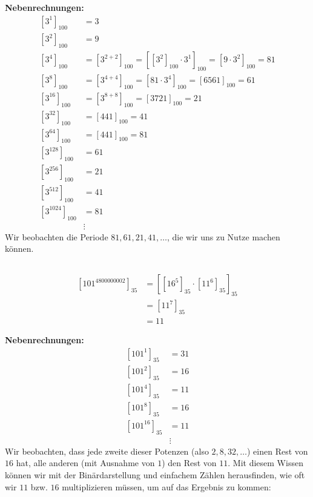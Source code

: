 \documentclass{../crypto}
\begin{document}
\textbf{Nebenrechnungen:}
\begin{align*}
  \left[3^{1}\right]_{100} &= 3 \\
  \left[3^{2}\right]_{100} &= 9 \\
  \left[3^{4}\right]_{100} &= \left[3^{2+2}\right]_{100} 
                            = \left[\left[3^{2}\right]_{100} \cdot 3^{1}\right]_{100} 
                            = \left[9 \cdot 3^{2}\right]_{100} = 81 \\
  \left[3^{8}\right]_{100} &= \left[3^{4+4}\right]_{100}
                            = \left[81 \cdot 3^{4}\right]_{100} 
                            = \left[6561\right]_{100} = 61 \\
  \left[3^{16}\right]_{100} &= \left[3^{8+8}\right]_{100}
                             = \left[3721\right]_{100} = 21 \\
  \left[3^{32}\right]_{100} &= \left[441\right]_{100} = 41 \\
  \left[3^{64}\right]_{100} &= \left[441\right]_{100} = 81 \\
  \left[3^{128}\right]_{100} &= 61 \\
  \left[3^{256}\right]_{100} &= 21 \\
  \left[3^{512}\right]_{100} &= 41 \\
  \left[3^{1024}\right]_{100} &= 81 \\
                              &\vdots
\end{align*}
Wir beobachten die Periode $81, 61, 21, 41, \dots$, die wir uns zu Nutze machen können.

\subsection{}
\begin{align*}
  \left[101^{4800000002}\right]_{35} &= \left[ \left[16^5\right]_{35} 
                                         \cdot \left[11^6\right]_{35}
                                        \right]_{35} \\
                                     &= \left[11^7\right]_{35} \\
                                     &= 11
\end{align*}

\textbf{Nebenrechnungen:}
\begin{align*}
  \left[101^{1}\right]_{35} &= 31 \\
  \left[101^{2}\right]_{35} &= 16 \\
  \left[101^{4}\right]_{35} &= 11 \\
  \left[101^{8}\right]_{35} &= 16 \\
  \left[101^{16}\right]_{35} &= 11 \\
                             &\vdots
\end{align*}
Wir beobachten, dass jede zweite dieser Potenzen (also $2, 8, 32, \dots$) einen
Rest von $16$ hat, alle anderen (mit Ausnahme von $1$) den Rest von $11$.
Mit diesem Wissen können wir mit der Binärdarstellung und einfachem Zählen
herausfinden, wie oft wir $11$ bzw. $16$ multiplizieren müssen, um auf das 
Ergebnis zu kommen:
\end{document}
